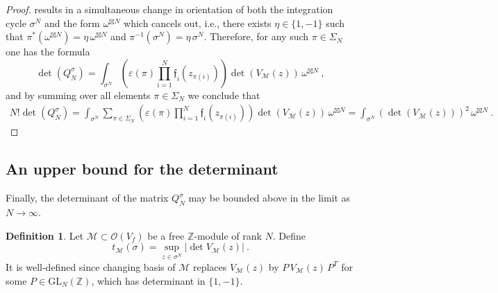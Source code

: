 \documentclass[a4paper,10pt]{amsart}
\theoremstyle{definition}
\newtheorem{defn}[thm]{Definition}
\theoremstyle{remark}
\numberwithin{equation}{section}
\newcommand{\Z}{\mathbb Z}
\newcommand{\ff}{\mathfrak{f}}
\newcommand{\0}{\color{blue}{\mathsf{0}}}
\begin{document}
\begin{proof}
  results in a 
 simultaneous  change in orientation of both the integration cycle $\sigma^{N}$ and the form $\omega^{\boxtimes N}$ which cancels out, i.e., there exists $\eta \in \{1,-1\}$ such that
 $\pi^* (\omega^{\boxtimes N} )= \eta \,\omega^{\boxtimes N}$ and $\pi^{-1} (\sigma^N) = \eta \, \sigma^N$. Therefore, for any such $\pi \in \Sigma_N$ one has the formula 
 \[    \det(Q^{\sigma}_N)  =   \int_{\sigma^{N}}      \left(\varepsilon(\pi)  \prod_{i=1}^N   \ff_i(z_{\pi(i)} )  \right)   \det  (V_{\mathcal{M}} (z) )    \,     \omega^{\boxtimes N } \ , \]
and  by summing over all elements $\pi \in \Sigma_N$ we conclude that 
\begin{align*} 
N! \det(Q^{\sigma}_N)  
 = \int_{\sigma^{N}}  \sum_{\pi \in \Sigma_N}     \left(\varepsilon(\pi)  \prod_{i=1}^N   \ff_i(z_{\pi(i)} )  \right)    \det  (V_{\mathcal{M}} (z) )      \,     \omega^{\boxtimes N }  =  \int_{\sigma^{N}} \left( \det  (V_{\mathcal{M}} (z) )\right)^2\,     \omega^{\boxtimes  N}  \ . 
\end{align*}

\end{proof}
\subsection{An upper bound for the determinant}
Finally, the determinant of the matrix $Q^{\sigma}_N$ may be bounded above in the limit as $N\rightarrow \infty$. 


\begin{defn} Let $\mathcal{M} \subset \mathcal{O}(V_f)$ be a free $\Z$-module of rank $N$. Define 
\begin{equation}\label{tMDef}  t_{\mathcal{M}} (\sigma) = \sup_{z \in \sigma^N}  \left| \det V_{\mathcal{M}}(z) \right| \ . 
\end{equation}
It is well-defined since  changing  basis of $\mathcal{M}$ replaces  $V_{\mathcal{M}}(z) $  by 
$P \, V_{\mathcal{M}}(z)  \, P^T$  for some $P \in \mathrm{GL}_N(\Z)$, which has determinant in  $\{1,-1\}$. 
\end{defn} 
\end{document}
